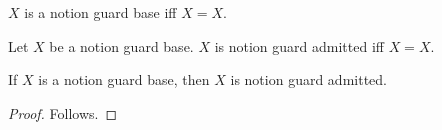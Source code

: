 \begin{definition}\label{notion_guard_base}
    $X$ is a notion guard base iff $X=X$.
\end{definition}

\begin{definition}\label{notion_guard_admitted}
    Let $X$ be a notion guard base.
    $X$ is notion guard admitted iff $X=X$.
\end{definition}

\begin{proposition}\label{notion_implication_guard}
    If $X$ is a notion guard base, then $X$ is notion guard admitted.
\end{proposition}
\begin{proof}
    Follows.
\end{proof}
